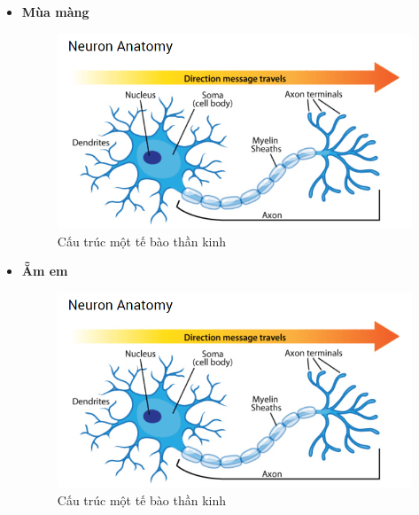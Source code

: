 \documentclass[12pt,a4paper,oneside]{book}
\numberwithin{equation}{chapter} %
\numberwithin{figure}{chapter} %
\numberwithin{table}{chapter} %
\begin{document}
\begin{itemize}
\item \textbf{Mùa màng}
\FloatBarrier
\begin{figure}[htp]
\begin{center}
\includegraphics[scale=0.8]{chap2/c2_figs/neuron.png}
\end{center}
\caption{Cấu trúc một tế bào thần kinh}
\label{fig:neuronsinhhoc}
\end{figure}
\FloatBarrier

\item \textbf{Ẵm em}
\FloatBarrier
\begin{figure}[htp]
\begin{center}
\includegraphics[scale=0.8]{chap2/c2_figs/neuron.png}
\end{center}
\caption{Cấu trúc một tế bào thần kinh}
\label{fig:neuronsinhhoc}
\end{figure}
\FloatBarrier


\end{itemize}
\end{document}
